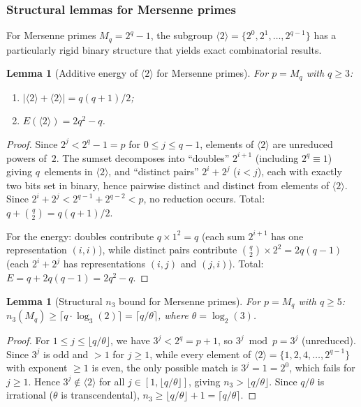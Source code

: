 \documentclass[12pt, a4paper]{amsart}
\theoremstyle{plain}
\newtheorem{lemma}[theorem]{Lemma}
\theoremstyle{definition}
\theoremstyle{remark}
\begin{document}
\subsubsection{Structural lemmas for Mersenne primes}
\label{sec:mersenne-structural}

For Mersenne primes $M_q = 2^q - 1$, the subgroup
$\langle 2 \rangle = \{2^0, 2^1, \ldots, 2^{q-1}\}$ has
a particularly rigid binary structure that yields exact
combinatorial results.

\begin{lemma}[Additive energy of $\langle 2 \rangle$ for Mersenne primes]
\label{lem:energy-mersenne}
For $p = M_q$ with $q \geq 3$:
\begin{enumerate}[label=(\roman*)]
  \item $|\langle 2 \rangle + \langle 2 \rangle| = q(q+1)/2$;
  \item $E(\langle 2 \rangle) = 2q^2 - q$.
\end{enumerate}
\end{lemma}

\begin{proof}
Since $2^j < 2^q - 1 = p$ for $0 \leq j \leq q-1$,
elements of $\langle 2 \rangle$ are unreduced powers of~$2$.
The sumset decomposes into ``doubles'' $2^{i+1}$ (including
$2^q \equiv 1$) giving $q$~elements in $\langle 2 \rangle$,
and ``distinct pairs'' $2^i + 2^j$ ($i < j$), each with
exactly two bits set in binary, hence pairwise distinct and
distinct from elements of $\langle 2 \rangle$. Since
$2^i + 2^j < 2^{q-1} + 2^{q-2} < p$, no reduction occurs.
Total: $q + \binom{q}{2} = q(q+1)/2$.

For the energy: doubles contribute $q \times 1^2 = q$
(each sum $2^{i+1}$ has one representation $(i,i)$), while
distinct pairs contribute $\binom{q}{2} \times 2^2 = 2q(q-1)$
(each $2^i + 2^j$ has representations $(i,j)$ and $(j,i)$).
Total: $E = q + 2q(q-1) = 2q^2 - q$.
\end{proof}

\begin{lemma}[Structural $n_3$ bound for Mersenne primes]
\label{lem:n3-mersenne}
For $p = M_q$ with $q \geq 5$:
$n_3(M_q) \geq \lceil q \cdot \log_3(2) \rceil = \lceil q/\theta \rceil$,
where $\theta = \log_2(3)$.
\end{lemma}

\begin{proof}
For $1 \leq j \leq \lfloor q/\theta \rfloor$, we have
$3^j < 2^q = p + 1$, so $3^j \bmod p = 3^j$ (unreduced).
Since $3^j$ is odd and $> 1$ for $j \geq 1$, while every
element of $\langle 2 \rangle = \{1, 2, 4, \ldots, 2^{q-1}\}$
with exponent $\geq 1$ is even, the only possible match is
$3^j = 1 = 2^0$, which fails for $j \geq 1$.
Hence $3^j \notin \langle 2 \rangle$ for all
$j \in [1, \lfloor q/\theta \rfloor]$, giving
$n_3 > \lfloor q/\theta \rfloor$.
Since $q/\theta$ is irrational ($\theta$ is transcendental),
$n_3 \geq \lfloor q/\theta \rfloor + 1 = \lceil q/\theta \rceil$.
\end{proof}
\end{document}
